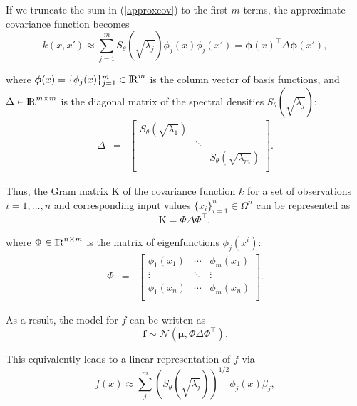 \documentclass[]{interact}
\theoremstyle{plain}%
\theoremstyle{definition}
\theoremstyle{remark}
\begin{document}
If we truncate the sum in (\ref{approxcov}) to the first $m$ terms, the approximate covariance function becomes
%
\begin{equation}
k(x,x') \approx \sum_{j=1}^m S_{\theta}(\sqrt{\lambda_j}) \phi_j(x) \phi_j(x') = \boldsymbol{\phi}(x)^\intercal \Delta \boldsymbol{\phi}(x'), \nonumber
\end{equation}

\noindent where $\boldsymbol{\phi}(x)=\{\phi_j(x)\}_{j=1}^{m} \in {\rm I\!R}^{m}$ is the column vector of basis functions, and $\Delta  \in {\rm I\!R}^{m\times m}$ is the diagonal matrix of the spectral densities $S_{\theta}(\sqrt{\lambda_j})$: 
%
\begin{eqnarray}
\Delta &=&  \begin{bmatrix}
    S_{\theta}(\sqrt{\lambda_1}) & & \\
    & \ddots & \nonumber \\
    & & S_{\theta}(\sqrt{\lambda_m}) \\
  \end{bmatrix}.
\end{eqnarray}

Thus, the Gram matrix $\text{K}$ of the covariance function $k$ for a set of observations $i=1,\ldots,n$ and corresponding input values $\{x_i\}_{i=1}^{n} \in \Omega^{n}$ can be represented as
%
\begin{equation}
\text{K}= \Phi \Delta \Phi^\intercal, \nonumber
\end{equation}

\noindent where $\Phi \in {\rm I\!R}^{n\times m}$ is the matrix of eigenfunctions $\phi_j(x^i)$:
%
\begin{eqnarray}
\Phi &=&  \left[ {\begin{array}{ccc}
   \phi_1(x_1) & \cdots & \phi_m(x_1)  \\
    \vdots &\ddots & \vdots  \nonumber \\ 
    \phi_1(x_n) & \cdots & \phi_m(x_n) \\
  \end{array} } \right].
\end{eqnarray}
 
\noindent As a result, the model for $f$ can be written as
%
\begin{equation}
\mathbf{f} \sim \mathcal{N}(\boldsymbol{\mu},\Phi \Delta \Phi^\intercal). \nonumber
\end{equation}

\noindent This equivalently leads to a linear representation of $f$ via
%
\begin{equation}\label{approxf}
f(x) \approx \sum_{j}^m \left( S_{\theta}(\sqrt{\lambda_j})\right)^{1/2} \phi_j(x) \beta_j,
\end{equation}
\end{document}
